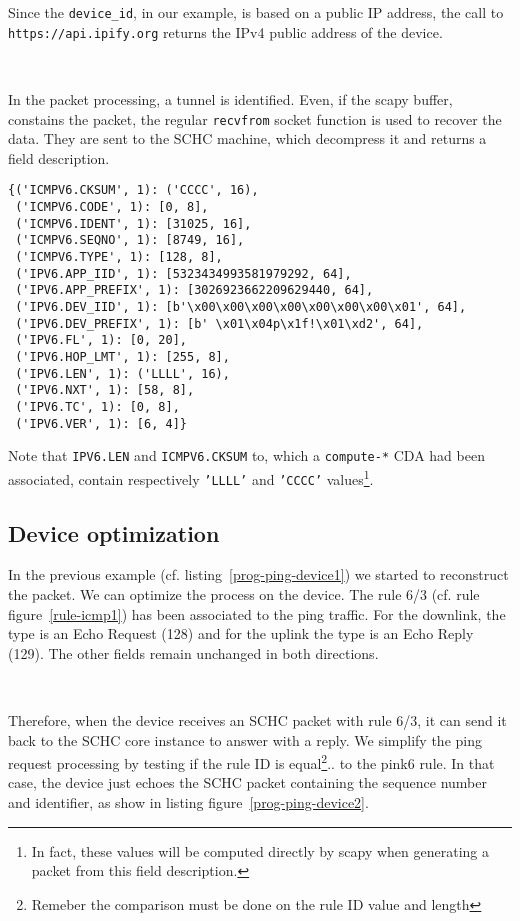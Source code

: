 \documentclass[onecolumn,12pt]{book}
\newcounter{c}
\begin{document}
 Since the \texttt{device\_id}, in our example, is based on a public IP address, the call to \texttt{https://api.ipify.org} returns the IPv4 public address of the device. 
 
 ~~

In the packet processing, a tunnel is identified. Even, if the scapy buffer, constains the packet, the regular \texttt{recvfrom} socket function is used to recover the data. They are sent to the SCHC machine, which decompress it and returns a field description.

\begin{lstlisting}
{('ICMPV6.CKSUM', 1): ('CCCC', 16),
 ('ICMPV6.CODE', 1): [0, 8],
 ('ICMPV6.IDENT', 1): [31025, 16],
 ('ICMPV6.SEQNO', 1): [8749, 16],
 ('ICMPV6.TYPE', 1): [128, 8],
 ('IPV6.APP_IID', 1): [5323434993581979292, 64],
 ('IPV6.APP_PREFIX', 1): [3026923662209629440, 64],
 ('IPV6.DEV_IID', 1): [b'\x00\x00\x00\x00\x00\x00\x00\x01', 64],
 ('IPV6.DEV_PREFIX', 1): [b' \x01\x04p\x1f!\x01\xd2', 64],
 ('IPV6.FL', 1): [0, 20],
 ('IPV6.HOP_LMT', 1): [255, 8],
 ('IPV6.LEN', 1): ('LLLL', 16),
 ('IPV6.NXT', 1): [58, 8],
 ('IPV6.TC', 1): [0, 8],
 ('IPV6.VER', 1): [6, 4]}
\end{lstlisting}

Note that \texttt{IPV6.LEN} and \texttt{ICMPV6.CKSUM} to, which a \texttt{compute-*} CDA had been associated, contain respectively \texttt{'LLLL'} and \texttt{'CCCC'} values\footnote{In fact, these values will be computed directly by scapy when generating a packet from this field description.}.

\subsection{Device optimization}

In the previous example (cf. listing~\vref{prog-ping-device1}) we started to reconstruct the packet. We can optimize the process on the device. The rule 6/3 (cf. rule figure~\vref{rule-icmp1}) has been associated to the ping traffic. For the downlink, the type is an Echo Request (128) and for the uplink the type is an Echo Reply (129). The other fields remain unchanged in both directions.


~~

Therefore, when the device receives an SCHC packet with rule 6/3, it can send it back to the SCHC core instance to answer with a reply.
We simplify the ping request processing by testing if the rule ID is equal\footnote{Remeber the comparison must be done on the rule ID value and length}.. to the pink6 rule. In that case, the device just echoes the SCHC packet containing the sequence number and identifier, as show in listing figure~\vref{prog-ping-device2}.
\end{document}
